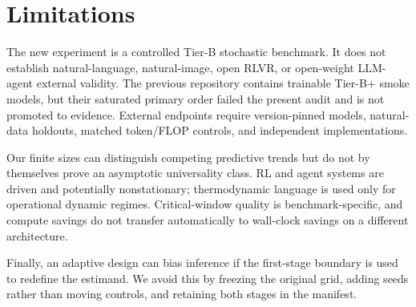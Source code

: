 \section{Limitations}

The new experiment is a controlled Tier-B stochastic benchmark.  It does not
establish natural-language, natural-image, open RLVR, or open-weight LLM-agent
external validity.  The previous repository contains trainable Tier-B+ smoke
models, but their saturated primary order failed the present audit and is not
promoted to evidence.  External endpoints require version-pinned models,
natural-data holdouts, matched token/FLOP controls, and independent
implementations.

Our finite sizes can distinguish competing predictive trends but do not by
themselves prove an asymptotic universality class.  RL and agent systems are
driven and potentially nonstationary; thermodynamic language is used only for
operational dynamic regimes.  Critical-window quality is benchmark-specific,
and compute savings do not transfer automatically to wall-clock savings on a
different architecture.

Finally, an adaptive design can bias inference if the first-stage boundary is
used to redefine the estimand.  We avoid this by freezing the original grid,
adding seeds rather than moving controls, and retaining both stages in the
manifest.
